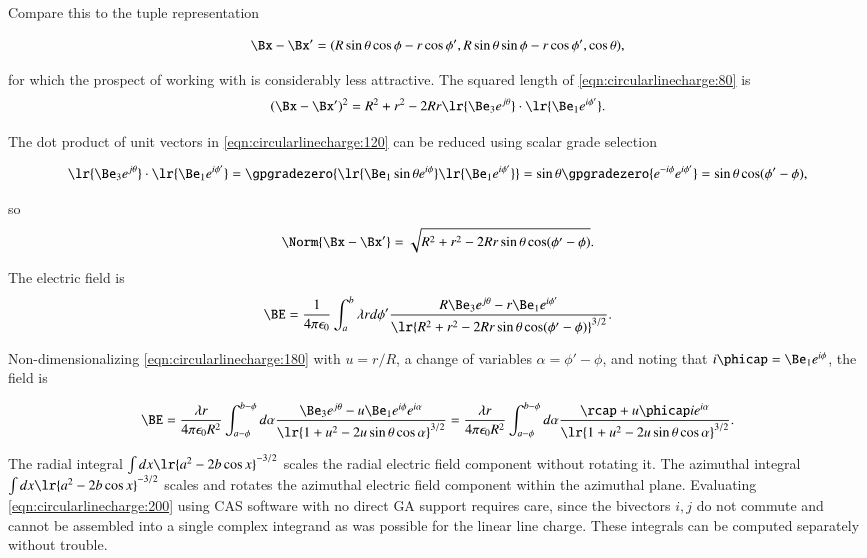 Compare this to the tuple representation

\begin{dmath}\label{eqn:circularlinecharge:100}
\Bx - \Bx'
= ( R \sin\theta \cos\phi - r \cos\phi', R \sin\theta \sin\phi - r \cos\phi', \cos\theta ),
\end{dmath}

for which the prospect of working with is considerably less attractive.  The squared length of \cref{eqn:circularlinecharge:80} is
\begin{dmath}\label{eqn:circularlinecharge:120}
(\Bx - \Bx')^2
=
R^2 + r^2 - 2 R r \lr{\Be_3 e^{j \theta} } \cdot \lr{ \Be_1 e^{i \phi'} }.
\end{dmath}

The dot product of unit vectors in \cref{eqn:circularlinecharge:120} can be reduced using scalar grade selection

\begin{dmath}\label{eqn:circularlinecharge:140}
\lr{\Be_3 e^{j \theta }} \cdot \lr{ \Be_1 e^{i \phi'} }
=
\gpgradezero{
\lr{ \Be_1 \sin\theta e^{i \phi} } \lr{ \Be_1 e^{i \phi'}}
}
=
\sin\theta
\gpgradezero{
e^{-i \phi} e^{i \phi'}
}
=
\sin\theta \cos( \phi' - \phi ),
\end{dmath}

so
\begin{dmath}\label{eqn:circularlinecharge:160}
\Norm{ \Bx - \Bx' }
=
\sqrt{
R^2 + r^2 - 2 R r \sin\theta \cos( \phi' - \phi )
}.
\end{dmath}

The electric field is
\begin{dmath}\label{eqn:circularlinecharge:180}
\BE = \frac{1}{4 \pi \epsilon_0} \int_a^b \lambda r d\phi' \frac{ R \Be_3 e^{j \theta } - r \Be_1 e^{i \phi'} }{\lr{ R^2 + r^2 - 2 R r \sin\theta \cos( \phi' - \phi ) }^{3/2} }.
\end{dmath}

Non-dimensionalizing \cref{eqn:circularlinecharge:180} with \( u = r/R \), a change of variables \( \alpha = \phi' - \phi \), and noting that \( i \phicap = \Be_1 e^{i \phi} \), the field is

\begin{dmath}\label{eqn:circularlinecharge:200}
\BE
= \frac{\lambda r}{4 \pi \epsilon_0 R^2} \int_{a-\phi}^{b-\phi} d\alpha \frac{ \Be_3 e^{j \theta } - u \Be_1 e^{i\phi} e^{i \alpha} }{\lr{ 1 + u^2 - 2 u \sin\theta \cos \alpha }^{3/2} }
= \frac{\lambda r}{4 \pi \epsilon_0 R^2} \int_{a-\phi}^{b-\phi} d\alpha \frac{ \rcap + u \phicap i e^{i \alpha } }{\lr{ 1 + u^2 - 2 u \sin\theta \cos \alpha }^{3/2} }.
\end{dmath}

The radial integral \( \int dx \lr{ a^2 - 2 b \cos x }^{-3/2} \) scales the radial electric field component without rotating it.
The azimuthal integral \( \int dx \lr{ a^2 - 2 b \cos x }^{-3/2} \) scales and rotates the azimuthal electric field component within the azimuthal plane.
Evaluating \cref{eqn:circularlinecharge:200} using CAS software with no direct GA support requires care, since the bivectors \( i, j \) do not commute and cannot be assembled into a single complex integrand as was possible for the linear line charge.  These integrals can be computed separately without trouble.

